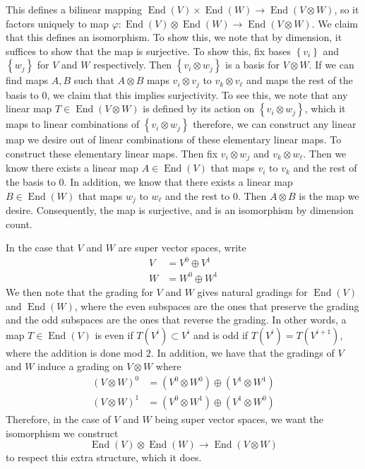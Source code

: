 \documentclass[psamsfonts]{amsart}
\theoremstyle{definition}
\theoremstyle{remark}
\newcommand{\set}[1]{\left\lbrace #1 \right\rbrace}
\DeclareMathOperator{\End}{End}
\begin{document}
This defines a bilinear mapping $\End(V) \times \End(W) \to \End(V \otimes W)$, so it factors uniquely to map $\varphi : \End(V) \otimes \End(W) \to \End(V \otimes W)$. We claim that this defines an isomorphism. To show this, we note that by dimension, it suffices to show that the map is surjective. To show this, fix bases $\set{v_i}$ and $\set{w_j}$ for $V$ and $W$ respectively. Then $\set{v_i \otimes w_j}$ is a basis for $V \otimes W$. If we can find maps $A,B$ such that $A \otimes B$ maps $v_i \otimes v_j$ to $v_k \otimes v_\ell$ and maps the rest of the basis to $0$, we claim that this implies surjectivity. To see this, we note that any linear map $T \in \End(V \otimes W)$ is defined by its action on $\set{v_i \otimes w_j}$, which it maps to linear combinations of $\set{v_i \otimes w_j}$ therefore, we can construct any linear map we desire out of linear combinations of these elementary linear maps. To construct these elementary linear maps. Then fix $v_i \otimes w_j$ and $v_k \otimes w_\ell$. Then we know there exists a linear map $A \in \End(V)$ that maps $v_i$ to $v_k$ and the rest of the basis to $0$. In addition, we know that there exists a linear map $B \in \End(W)$ that maps $w_j$ to $w_\ell$ and the rest to $0$. Then $A \otimes B$ is the map we desire. Consequently, the map is surjective, and is an isomorphism by dimension count.

In the case that $V$ and $W$ are super vector spaces, write
\begin{align*}
V &= V^0 \oplus V^1 \\
W &= W^0 \oplus W^1
\end{align*}
We then note that the grading for $V$ and $W$ gives natural gradings for $\End(V)$ and $\End(W)$, where the even subspaces are the ones that preserve the grading and the odd subspaces are the ones that reverse the grading. In other words, a map $T \in \End(V)$ is even if $T(V^i) \subset V^i$ and is odd if $T(V^i)  = T(V^{i+1})$, where the addition is done mod $2$. In addition, we have that the gradings of $V$ and $W$ induce a grading on $V \otimes W$ where
\begin{align*}
(V \otimes W)^0 &= (V^0 \otimes W^0) \oplus (V^1 \otimes W^1) \\
(V \otimes W)^1 &= (V^0 \otimes W^1) \oplus (V^1 \otimes W^0)
\end{align*}
Therefore, in the case of $V$ and $W$ being super vector spaces, we want the isomorphism we construct 
$$\End(V) \otimes \End(W) \to \End(V \otimes W)$$
to respect this extra structure, which it does.
\end{document}
